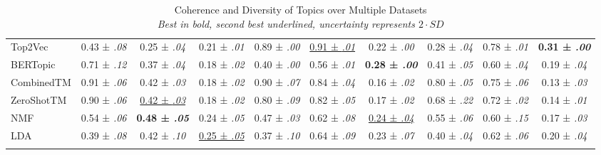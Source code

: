 \begin{table*}[p]
{\begin{tabular}{lccccccccc}
Top2Vec & 0.43 ± \textit{.08} & 0.25 ± \textit{.04} & 0.21 ± \textit{.01} & 0.89 ± \textit{.00} & \underline{0.91 ± \textit{.01}} & 0.22 ± \textit{.00} & 0.28 ± \textit{.04} & 0.78 ± \textit{.01} & \textbf{0.31 ± \textit{.00}}\\
BERTopic & 0.71 ± \textit{.12} & 0.37 ± \textit{.04} & 0.18 ± \textit{.02} & 0.40 ± \textit{.00} & 0.56 ± \textit{.01} & \textbf{0.28 ± \textit{.00}} & 0.41 ± \textit{.05} & 0.60 ± \textit{.04} & 0.19 ± \textit{.04}\\
CombinedTM & 0.91 ± \textit{.06} & 0.42 ± \textit{.03} & 0.18 ± \textit{.02} & 0.90 ± \textit{.07} & 0.84 ± \textit{.04} & 0.16 ± \textit{.02} & 0.80 ± \textit{.05} & 0.75 ± \textit{.06} & 0.13 ± \textit{.03}\\
ZeroShotTM & 0.90 ± \textit{.06} & \underline{0.42 ± \textit{.03}} & 0.18 ± \textit{.02} & 0.80 ± \textit{.09} & 0.82 ± \textit{.05} & 0.17 ± \textit{.02} & 0.68 ± \textit{.22} & 0.72 ± \textit{.02} & 0.14 ± \textit{.01}\\
NMF & 0.54 ± \textit{.06} & \textbf{0.48 ± \textit{.05}} & 0.24 ± \textit{.05} & 0.47 ± \textit{.03} & 0.62 ± \textit{.08} & \underline{0.24 ± \textit{.04}} & 0.55 ± \textit{.06} & 0.60 ± \textit{.15} & 0.17 ± \textit{.03}\\
LDA & 0.39 ± \textit{.08} & 0.42 ± \textit{.10} & \underline{0.25 ± \textit{.05}} & 0.37 ± \textit{.10} & 0.64 ± \textit{.09} & 0.23 ± \textit{.07} & 0.40 ± \textit{.04} & 0.62 ± \textit{.06} & 0.20 ± \textit{.04}\\
\bottomrule
\label{table:evaluation}
\end{tabular}
}
\egroup
\caption{ Coherence and Diversity of Topics over Multiple Datasets \\
\textit{Best in bold, second best underlined, uncertainty represents $2 \cdot SD$}
}
\end{table*}